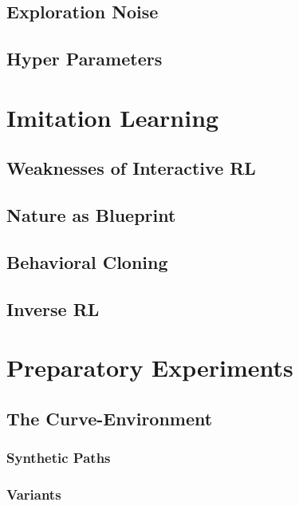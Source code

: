     \subsection{Exploration Noise}
    
    \subsection{Hyper Parameters}
    
    
\newpage
\section{Imitation Learning}
    
        \subsection{Weaknesses of Interactive RL}
         \label{subchap:weak}
        \subsection{Nature as Blueprint}
        
        \subsection{Behavioral Cloning}
        
        \subsection{Inverse RL}
        
\newpage
\section{Preparatory Experiments} \label{chap:synthetic}

    \subsection{The Curve-Environment}
        
        \subsubsection{Synthetic Paths}
        
        \subsubsection{Variants}
        
